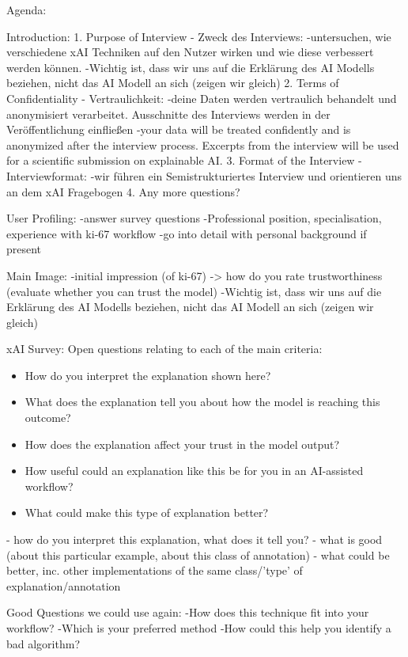 Agenda:

Introduction:
1. Purpose of Interview - Zweck des Interviews:
-untersuchen, wie verschiedene xAI Techniken auf den Nutzer wirken und wie diese verbessert werden können.
-Wichtig ist, dass wir uns auf die Erklärung des AI Modells beziehen, nicht das AI Modell an sich (zeigen wir gleich)
2. Terms of Confidentiality - Vertraulichkeit:
-deine Daten werden vertraulich behandelt und anonymisiert verarbeitet. Ausschnitte des Interviews werden in der Veröffentlichung einfließen
-your data will be treated confidently and is anonymized after the interview process. Excerpts from the interview will be used for a scientific submission on explainable AI.
3. Format of the Interview - Interviewformat:
-wir führen ein Semistrukturiertes Interview und orientieren uns an dem xAI Fragebogen
4. Any more questions?

User Profiling:
-answer survey questions
-Professional position, specialisation, experience with ki-67 workflow
-go into detail with personal background if present

Main Image:
-initial impression (of ki-67) -> how do you rate trustworthiness (evaluate whether you can trust the model)
-Wichtig ist, dass wir uns auf die Erklärung des AI Modells beziehen, nicht das AI Modell an sich (zeigen wir gleich)

xAI Survey:
Open questions relating to each of the main criteria:
\begin{itemize}
    \item How do you interpret the explanation shown here?
    \item What does the explanation tell you about how the model is reaching this outcome?
    \item How does the explanation affect your trust in the model output?
    \item How useful could an explanation like this be for you in an AI-assisted workflow?
    \item What could make this type of explanation better?
\end{itemize}
- how do you interpret this explanation, what does it tell you?
 - what is good (about this particular example, about this class of annotation)
 - what could be better, inc. other implementations of the same class/'type' of explanation/annotation
 
 Good Questions we could use again:
-How does this technique fit into your workflow?
-Which is your preferred method 
-How could this help you identify a bad algorithm?